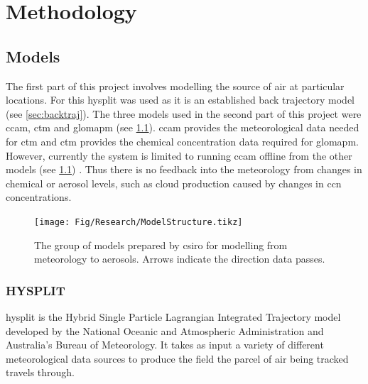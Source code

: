 \chapter{Methodology}
\label{ch:meth}


\section{Models}
\label{sec:ccg}

	The first part of this project involves modelling the source of air at particular locations. For this \gls{hysplit} was used as it is an established back trajectory model (see \cref{sec:backtraj}). The three models used in the second part of this project were \gls{ccam}, \gls{ctm} and \gls{glomapm} (see \cref{sec:ccg}). \gls{ccam} provides the meteorological data needed for \gls{ctm} and \gls{ctm} provides the chemical concentration data required for \gls{glomapm}. However, currently the system is limited to running \gls{ccam} offline from the other models (see \cref{fig:modelstruct}) \citep{mcgregor2008updated}. Thus there is no feedback into the meteorology from changes in chemical or aerosol levels, such as cloud production caused by changes in \gls{ccn} concentrations.

	\begin{figure}[!htb]
	    \centering
	    \vspace*{5mm}
	    \texttt{[image: Fig/Research/ModelStructure.tikz]}
	    \vspace*{5mm}
	    \caption{The group of models prepared by \gls{csiro} for modelling from meteorology to aerosols. Arrows indicate the direction data passes.}
	    \label{fig:modelstruct}
	\end{figure}


	\subsection{HYSPLIT}
	\label{subsec:hysplit}

	\gls{hysplit} is the Hybrid Single Particle Lagrangian Integrated Trajectory model developed by the National Oceanic and Atmospheric Administration and Australia's Bureau of Meteorology. It takes as input a variety of different meteorological data sources to produce the field the parcel of air being tracked travels through.

